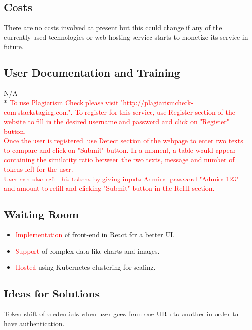 \documentclass[12pt, titlepage]{article}
\begin{document}
\subsection{Costs} 
There are no costs involved at present but this could change if any of the currently used technologies or web hosting service starts to monetize its service in future.

\subsection{User Documentation and Training} 
\st{N/A} \\*
\textcolor{red}{To use Plagiarism Check please visit "http://plagiarismcheck-com.stackstaging.com". To register for this service, use Register section of the website to fill in the desired username and password and click on "Register" button.}  \\

\textcolor{red}{Once the user is registered, use Detect section of the webpage to enter two texts to compare and click on "Submit" button. In a moment, a table would appear containing the similarity ratio between the two texts, message and number of tokens left for the user.} \\

\textcolor{red}{User can also refill his tokens by giving inputs Admiral password "Admiral123" and amount to refill and clicking "Submit" button in the Refill section.}  

\subsection{Waiting Room}
\begin{itemize}
\item \textcolor{red}{Implementation} of front-end in React for a better UI. 
\item \textcolor{red}{Support} of complex data like charts and images. 
\item \textcolor{red}{Hosted} using Kubernetes clustering for scaling.
\end{itemize}

\subsection{Ideas for Solutions}
Token shift of credentials when user goes from one URL to another in order to have authentication.
\end{document}
